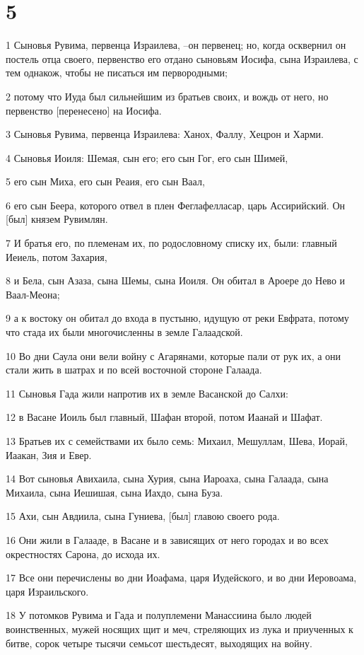 \chapter{5}

\par 1 Сыновья Рувима, первенца Израилева, --он первенец; но, когда осквернил он постель отца своего, первенство его отдано сыновьям Иосифа, сына Израилева, с тем однакож, чтобы не писаться им первородными;
\par 2 потому что Иуда был сильнейшим из братьев своих, и вождь от него, но первенство [перенесено] на Иосифа.
\par 3 Сыновья Рувима, первенца Израилева: Ханох, Фаллу, Хецрон и Харми.
\par 4 Сыновья Иоиля: Шемая, сын его; его сын Гог, его сын Шимей,
\par 5 его сын Миха, его сын Реаия, его сын Ваал,
\par 6 его сын Беера, которого отвел в плен Феглафелласар, царь Ассирийский. Он [был] князем Рувимлян.
\par 7 И братья его, по племенам их, по родословному списку их, были: главный Иеиель, потом Захария,
\par 8 и Бела, сын Азаза, сына Шемы, сына Иоиля. Он обитал в Ароере до Нево и Ваал-Меона;
\par 9 а к востоку он обитал до входа в пустыню, идущую от реки Евфрата, потому что стада их были многочисленны в земле Галаадской.
\par 10 Во дни Саула они вели войну с Агарянами, которые пали от рук их, а они стали жить в шатрах и по всей восточной стороне Галаада.
\par 11 Сыновья Гада жили напротив их в земле Васанской до Салхи:
\par 12 в Васане Иоиль был главный, Шафан второй, потом Иаанай и Шафат.
\par 13 Братьев их с семействами их было семь: Михаил, Мешуллам, Шева, Иорай, Иаакан, Зия и Евер.
\par 14 Вот сыновья Авихаила, сына Хурия, сына Иароаха, сына Галаада, сына Михаила, сына Иешишая, сына Иахдо, сына Буза.
\par 15 Ахи, сын Авдиила, сына Гуниева, [был] главою своего рода.
\par 16 Они жили в Галааде, в Васане и в зависящих от него городах и во всех окрестностях Сарона, до исхода их.
\par 17 Все они перечислены во дни Иоафама, царя Иудейского, и во дни Иеровоама, царя Израильского.
\par 18 У потомков Рувима и Гада и полуплемени Манассиина было людей воинственных, мужей носящих щит и меч, стреляющих из лука и приученных к битве, сорок четыре тысячи семьсот шестьдесят, выходящих на войну.
